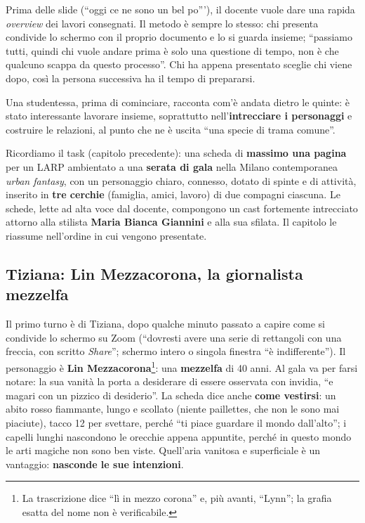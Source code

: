 Prima delle slide (``oggi ce ne sono un bel po'''), il docente vuole dare una
rapida \emph{overview} dei lavori consegnati. Il metodo è sempre lo stesso: chi
presenta condivide lo schermo con il proprio documento e lo si guarda insieme;
``passiamo tutti, quindi chi vuole andare prima è solo una questione di tempo, non
è che qualcuno scappa da questo processo''. Chi ha appena presentato sceglie chi
viene dopo, così la persona successiva ha il tempo di prepararsi.

Una studentessa, prima di cominciare, racconta com'è andata dietro le quinte: è
stato interessante lavorare insieme, soprattutto nell'\textbf{intrecciare i
personaggi} e costruire le relazioni, al punto che ne è uscita ``una specie di
trama comune''.

Ricordiamo il task (capitolo precedente): una scheda di \textbf{massimo una
pagina} per un LARP ambientato a una \textbf{serata di gala} nella Milano
contemporanea \emph{urban fantasy}, con un personaggio chiaro, connesso, dotato di
spinte e di attività, inserito in \textbf{tre cerchie} (famiglia, amici, lavoro)
di due compagni ciascuna. Le schede, lette ad alta voce dal docente, compongono un
cast fortemente intrecciato attorno alla stilista \textbf{Maria Bianca Giannini}
e alla sua sfilata. Il capitolo le riassume nell'ordine in cui vengono
presentate.

\subsection{Tiziana: Lin Mezzacorona, la giornalista mezzelfa}

Il primo turno è di Tiziana, dopo qualche minuto passato a capire come si
condivide lo schermo su Zoom (``dovresti avere una serie di rettangoli con una
freccia, con scritto \emph{Share}''; schermo intero o singola finestra ``è
indifferente''). Il personaggio è \textbf{Lin Mezzacorona}\footnote{La
trascrizione dice ``lì in mezzo corona'' e, più avanti, ``Lynn''; la grafia esatta
del nome non è verificabile.}: una \textbf{mezzelfa} di 40 anni. Al gala va per
farsi notare: la sua vanità la porta a desiderare di essere osservata con invidia,
``e magari con un pizzico di desiderio''. La scheda dice anche \textbf{come
vestirsi}: un abito rosso fiammante, lungo e scollato (niente paillettes, che non
le sono mai piaciute), tacco 12 per svettare, perché ``ti piace guardare il mondo
dall'alto''; i capelli lunghi nascondono le orecchie appena appuntite, perché in
questo mondo le arti magiche non sono ben viste. Quell'aria vanitosa e superficiale
è un vantaggio: \textbf{nasconde le sue intenzioni}.

